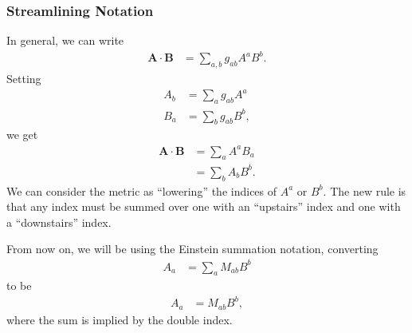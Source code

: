 \documentclass[10pt]{mypackage}
\begin{document}
  \subsubsection{Streamlining Notation}%
  In general, we can write
  \begin{align*}
    \mathbf{A}\cdot \mathbf{B} &= \sum_{a,b}g_{ab}A^{a}B^{b}.
  \end{align*}
  Setting
  \begin{align*}
    A_b &= \sum_{a}g_{ab}A^{a}\\
    B_a &= \sum_{b}g_{ab}B^{b},
  \end{align*}
  we get
  \begin{align*}
    \mathbf{A}\cdot \mathbf{B} &= \sum_{a}A^aB_a\\
                               &= \sum_{b}A_bB^{b}.
  \end{align*}
  We can consider the metric as ``lowering'' the indices of $A^{a}$ or $B^{b}$. The new rule is that any index must be summed over one with an ``upstairs'' index and one with a ``downstairs'' index.\newline

  From now on, we will be using the Einstein summation notation, converting
  \begin{align*}
    A_a &= \sum_{a}M_{ab}B^{b}
  \end{align*}
  to be
  \begin{align*}
    A_a &= M_{ab}B^{b},
  \end{align*}
  where the sum is implied by the double index.\newline
\end{document}
